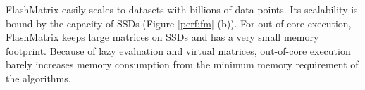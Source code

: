 
FlashMatrix easily scales to datasets with billions of data points. Its
scalability is bound by the capacity of SSDs (Figure \ref{perf:fm} (b)).
For out-of-core execution, FlashMatrix keeps large matrices on
SSDs and has a very small memory footprint.  Because of lazy evaluation and virtual matrices,
out-of-core execution barely increases memory consumption from
the minimum memory requirement of the algorithms. 

